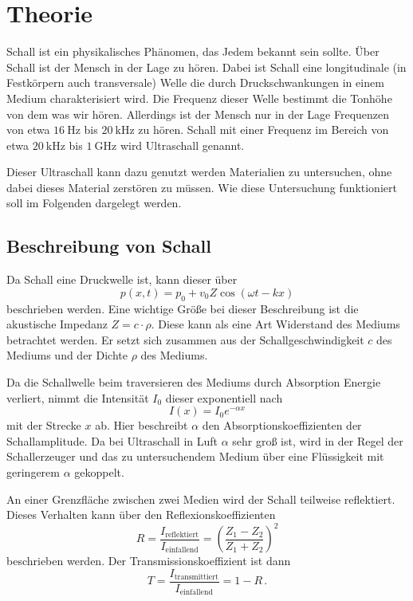 \section{Theorie}
\label{sec:Theorie}

Schall ist ein physikalisches Phänomen, das Jedem bekannt sein sollte. 
Über Schall ist der Mensch in der Lage zu hören.
Dabei ist Schall eine longitudinale (in Festkörpern auch transversale) Welle die durch Druckschwankungen in einem Medium charakterisiert wird.
Die Frequenz dieser Welle bestimmt die Tonhöhe von dem was wir hören.
Allerdings ist der Mensch nur in der Lage Frequenzen von etwa $\SI{16}{\hertz}$ bis $\SI{20}{\kilo\hertz}$ zu hören.
Schall mit einer Frequenz im Bereich von etwa $\SI{20}{\kilo\hertz}$ bis $\SI{1}{\giga\hertz}$ wird Ultraschall genannt. \cite{US1}

Dieser Ultraschall kann dazu genutzt werden Materialien zu untersuchen, ohne dabei dieses Material zerstören zu müssen.
Wie diese Untersuchung funktioniert soll im Folgenden dargelegt werden.


\subsection{Beschreibung von Schall}
\label{ssec:theorie_beschreibung}

Da Schall eine Druckwelle ist, kann dieser über
\begin{equation}
    p(x,t) = p_0 + v_0 Z \cos(\omega t - k x)
    \label{eq:schallwelle}
\end{equation}
beschrieben werden. 
Eine wichtige Größe bei dieser Beschreibung ist die akustische Impedanz $Z=c \cdot \rho$.
Diese kann als eine Art Widerstand des Mediums betrachtet werden.
Er setzt sich zusammen aus der Schallgeschwindigkeit $c$ des Mediums und der Dichte $\rho$ des Mediums.

Da die Schallwelle beim traversieren des Mediums durch Absorption Energie verliert, nimmt die Intensität $I_0$ dieser exponentiell nach
\begin{equation}
    I(x) = I_0 e^{-\alpha x}
    \label{eq:absorption}
\end{equation}
mit der Strecke $x$ ab. 
Hier beschreibt $\alpha$ den Absorptionskoeffizienten der Schallamplitude.
Da bei Ultraschall in Luft $\alpha$ sehr groß ist, wird in der Regel der Schallerzeuger und das zu untersuchendem Medium über eine Flüssigkeit mit geringerem $\alpha$ gekoppelt.

An einer Grenzfläche zwischen zwei Medien wird der Schall teilweise reflektiert.
Dieses Verhalten kann über den Reflexionskoeffizienten
\begin{equation}
    R = \frac{I_\text{reflektiert}}{I_\text{einfallend}} = \left( \frac{Z_1 - Z_2}{Z_1 + Z_2} \right)^2
    \label{eq:refelxion}
\end{equation}
beschrieben werden.
Der Transmissionskoeffizient ist dann
\begin{equation}
    T = \frac{I_\text{transmittiert}}{I_\text{einfallend}} = 1 - R \, .
    \label{eq:transmission}
\end{equation}


